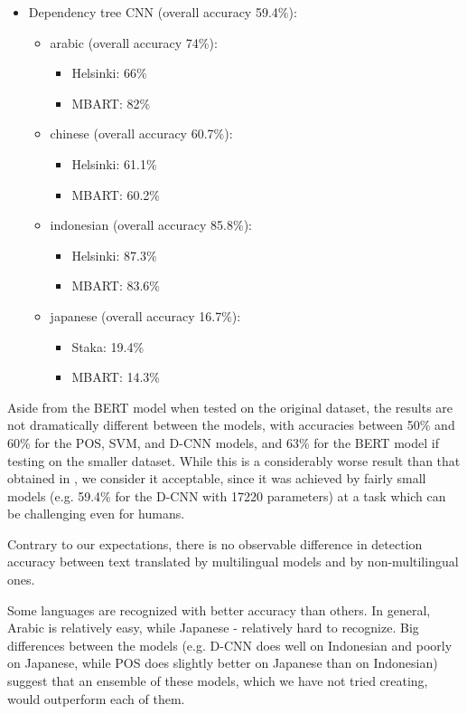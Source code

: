 \documentclass[twocolumn]{article}
\begin{document}
\begin{itemize}
\begin{itemize}
            \end{itemize}
	\item Dependency tree CNN (overall accuracy 59.4\%):
		\begin{itemize}
		\item{arabic} (overall accuracy 74\%): 
		\begin{itemize}
			\item Helsinki: 66\%
			\item MBART: 82\%
		\end{itemize}
		\item{chinese} (overall accuracy 60.7\%): 
		\begin{itemize}
			\item Helsinki: 61.1\%
			\item MBART: 60.2\%
		\end{itemize}
		\item{indonesian} (overall accuracy 85.8\%): 
		\begin{itemize}
			\item Helsinki: 87.3\%
			\item MBART: 83.6\%
		\end{itemize}
		\item{japanese} (overall accuracy 16.7\%): 
		\begin{itemize}
			\item Staka: 19.4\%
			\item MBART: 14.3\%
		\end{itemize}


		\end{itemize}
\end{itemize}

Aside from the BERT model when tested on the original dataset, the results are not dramatically different between the models, with accuracies between 50\% and 60\% for the POS, SVM, and D-CNN models, and 63\% for the BERT model if testing on the smaller dataset. While this is a considerably worse result than that obtained in \cite{roundtrip}, we consider it acceptable, since it was achieved by fairly small models (e.g. 59.4\% for the D-CNN with 17220 parameters) at a task which can be challenging even for humans.

Contrary to our expectations, there is no observable difference in detection accuracy between text translated by multilingual models and by non-multilingual ones.

Some languages are recognized with better accuracy than others. In general, Arabic is relatively easy, while Japanese - relatively hard to recognize. Big differences between the models (e.g. D-CNN does well on Indonesian and poorly on Japanese, while POS does slightly better on Japanese than on Indonesian) suggest that an ensemble of these models, which we have not tried creating, would outperform each of them.
\end{document}

